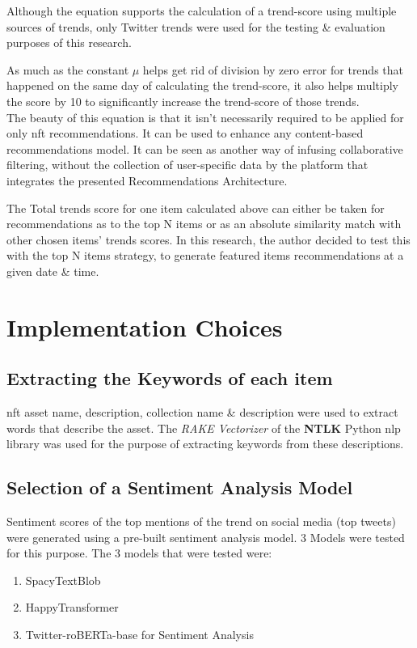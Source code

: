\documentclass[manuscript,natbib=false, anonymous]{acmart}
\begin{document}


Although the equation supports the calculation of a trend-score using multiple sources of trends, only Twitter trends were used for the testing \& evaluation purposes of this research. 

As much as the constant $\mu$ helps get rid of division by zero error for trends that happened on the same day of calculating the trend-score, it also helps multiply the score by 10 to significantly increase the trend-score of those trends.\\

The beauty of this equation is that it isn't necessarily required to be applied for only \gls{nft} recommendations. It can be used to enhance any content-based recommendations model. It can be seen as another way of infusing collaborative filtering, without the collection of user-specific data by the platform that integrates the presented Recommendations Architecture.

The Total trends score for one item calculated above can either be taken for recommendations as to the top N items or as an absolute similarity match with other chosen items' trends scores. In this research, the author decided to test this with the top N items strategy, to generate featured items recommendations at a given date \& time.

\section{Implementation Choices}

\subsection{Extracting the Keywords of each item}
\gls{nft} asset name, description, collection name \& description were used to extract words that describe the asset. The \textit{RAKE Vectorizer} of the \textbf{NTLK} Python \gls{nlp} library was used for the purpose of extracting keywords from these descriptions.

\subsection{Selection of a Sentiment Analysis Model}
Sentiment scores of the top mentions of the trend on social media (top tweets) were generated using a pre-built sentiment analysis model. 3 Models were tested for this purpose. The 3 models that were tested were:
\begin{enumerate}
\item SpacyTextBlob
\item HappyTransformer
\item Twitter-roBERTa-base for Sentiment Analysis
\end{enumerate}
\end{document}

